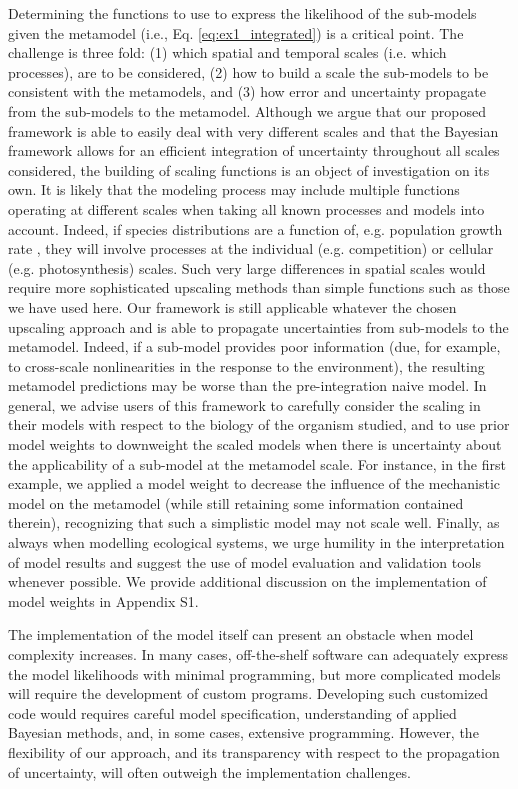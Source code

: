 \documentclass[11pt]{article}
\newcommand{\rev}[1]{{\color{RoyalBlue}#1}}
\begin{document}
Determining the functions to use to express the likelihood of the sub-models given the metamodel (i.e., Eq. \ref{eq:ex1_integrated}) is a critical point.
The challenge is three fold: (1) which spatial and temporal scales (i.e. which processes), are to be considered, (2) how to build a scale the sub-models to be consistent with the metamodels, and (3) how error and uncertainty propagate from the sub-models to the metamodel. 
Although we argue that our proposed framework is able to easily deal with very different scales and that the Bayesian framework allows for an efficient integration of uncertainty throughout all scales considered, the building of scaling functions is an object of investigation on its own. 
It is likely that the modeling process may include multiple functions operating at different scales when taking all known processes and models into account. 
Indeed, if species distributions are a function of, e.g. population growth rate \citep{Guisan2000}, they will involve processes at the individual (e.g. competition) or cellular (e.g. photosynthesis) scales. 
Such very large differences in spatial scales would require more sophisticated upscaling methods than simple functions such as those we have used here. 
Our framework is still applicable whatever the chosen upscaling approach and is able to propagate uncertainties from sub-models to the metamodel.
\rev{Indeed, if a sub-model provides poor information (due, for example, to cross-scale nonlinearities in the response to the environment), the resulting metamodel predictions may be worse than the pre-integration naive model.
In general, we advise users of this framework to carefully consider the scaling in their models with respect to the biology of the organism studied, and to use prior model weights to downweight the scaled models when there is uncertainty about the applicability of a sub-model at the metamodel scale.
For instance, in the first example, we applied a model weight to decrease the influence of the mechanistic model on the metamodel (while still retaining some information contained therein), recognizing that such a simplistic model may not scale well.
Finally, as always when modelling ecological systems, we urge humility in the interpretation of model results and suggest the use of model evaluation and validation tools whenever possible.
We provide additional discussion on the implementation of model weights in Appendix S1.}

The implementation of the model itself can present an obstacle when model complexity increases. 
In many cases, off-the-shelf software can adequately express the model likelihoods with minimal programming, but more complicated models will require the development of custom programs. 
Developing such customized code would requires careful model specification, understanding of applied Bayesian methods, and, in some cases, extensive programming. 
However, the flexibility of our approach, and its transparency with respect to the propagation of uncertainty, will often outweigh the implementation challenges.
\end{document}
